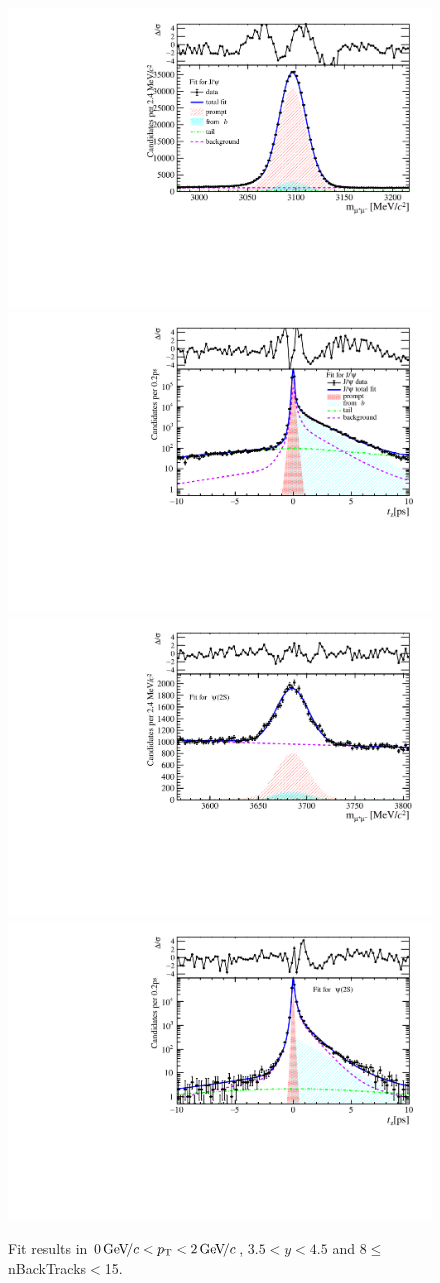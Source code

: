 \begin{figure}[H]
\begin{center}
\includegraphics[width=0.47\linewidth]{pdf/Jpsi/drawmassB/n2y3pt1.pdf}
\includegraphics[width=0.47\linewidth]{pdf/Jpsi/2DFitB/n2y3pt1.pdf}
\vspace*{-0.5cm}
\includegraphics[width=0.47\linewidth]{pdf/Psi2S/drawmassB/n2y3pt1.pdf}
\includegraphics[width=0.47\linewidth]{pdf/Psi2S/2DFitB/n2y3pt1.pdf}
\vspace*{-0.5cm}
\end{center}
\caption{Fit results in $0\text{\,Ge\kern -0.1em V\!/}c<p_{\mathrm{T}}<2\text{\,Ge\kern -0.1em V\!/}c$, $3.5<y<4.5$ and 8$\leq$nBackTracks$<$15.}
\label{Fitn2y3pt1}
\end{figure}
